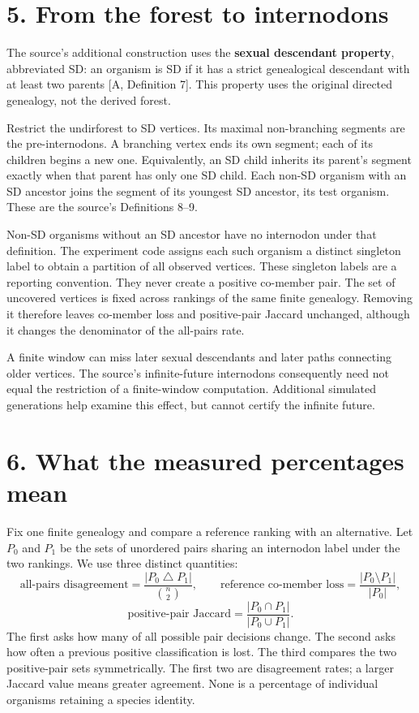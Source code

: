 \documentclass[
  11pt,
  letterpaper,
]{article}
\begin{document}
\section{5. From the forest to
internodons}\label{from-the-forest-to-internodons}

The source's additional construction uses the \textbf{sexual descendant
property}, abbreviated SD: an organism is SD if it has a strict
genealogical descendant with at least two parents {[}A, Definition 7{]}.
This property uses the original directed genealogy, not the derived
forest.

Restrict the undirforest to SD vertices. Its maximal non-branching
segments are the pre-internodons. A branching vertex ends its own
segment; each of its children begins a new one. Equivalently, an SD
child inherits its parent's segment exactly when that parent has only
one SD child. Each non-SD organism with an SD ancestor joins the segment
of its youngest SD ancestor, its test organism. These are the source's
Definitions 8--9.

Non-SD organisms without an SD ancestor have no internodon under that
definition. The experiment code assigns each such organism a distinct
singleton label to obtain a partition of all observed vertices. These
singleton labels are a reporting convention. They never create a
positive co-member pair. The set of uncovered vertices is fixed across
rankings of the same finite genealogy. Removing it therefore leaves
co-member loss and positive-pair Jaccard unchanged, although it changes
the denominator of the all-pairs rate.

A finite window can miss later sexual descendants and later paths
connecting older vertices. The source's infinite-future internodons
consequently need not equal the restriction of a finite-window
computation. Additional simulated generations help examine this effect,
but cannot certify the infinite future.

\section{6. What the measured percentages
mean}\label{what-the-measured-percentages-mean}

Fix one finite genealogy and compare a reference ranking with an
alternative. Let \(P_0\) and \(P_1\) be the sets of unordered pairs
sharing an internodon label under the two rankings. We use three
distinct quantities: \[
 \text{all-pairs disagreement}
       =\frac{|P_0\mathbin{\triangle}P_1|}{\binom n2},
 \qquad
 \text{reference co-member loss}
       =\frac{|P_0\setminus P_1|}{|P_0|},
\] \[
 \text{positive-pair Jaccard}
       =\frac{|P_0\cap P_1|}{|P_0\cup P_1|}.
\] The first asks how many of all possible pair decisions change. The
second asks how often a previous positive classification is lost. The
third compares the two positive-pair sets symmetrically. The first two
are disagreement rates; a larger Jaccard value means greater agreement.
None is a percentage of individual organisms retaining a species
identity.
\end{document}
